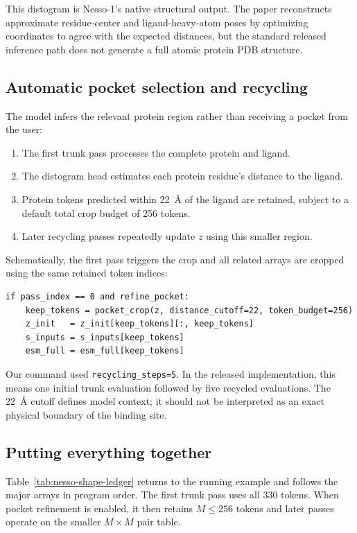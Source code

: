 \documentclass[11pt]{article}
\begin{document}
This distogram is Nesso-1's native structural output. The paper reconstructs
approximate residue-center and ligand-heavy-atom poses by optimizing coordinates
to agree with the expected distances, but the standard released inference path
does not generate a full atomic protein PDB structure.

\subsection{Automatic pocket selection and recycling}

The model infers the relevant protein region rather than receiving a pocket
from the user:

\begin{enumerate}
  \item The first trunk pass processes the complete protein and ligand.
  \item The distogram head estimates each protein residue's distance to the
  ligand.
  \item Protein tokens predicted within 22~\AA{} of the ligand are retained,
  subject to a default total crop budget of 256 tokens.
  \item Later recycling passes repeatedly update $z$ using this smaller region.
\end{enumerate}

Schematically, the first pass triggers the crop and all related arrays are
cropped using the same retained token indices:
\begin{verbatim}
if pass_index == 0 and refine_pocket:
    keep_tokens = pocket_crop(z, distance_cutoff=22, token_budget=256)
    z_init   = z_init[keep_tokens][:, keep_tokens]
    s_inputs = s_inputs[keep_tokens]
    esm_full = esm_full[keep_tokens]
\end{verbatim}

Our command used \texttt{recycling\_steps=5}. In the released implementation,
this means one initial trunk evaluation followed by five recycled evaluations.
The 22~\AA{} cutoff defines model context; it should not be interpreted as an
exact physical boundary of the binding site.

\subsection{Putting everything together}

Table~\ref{tab:nesso-shape-ledger} returns to the running example and follows
the major arrays in program order. The first trunk pass uses all 330 tokens.
When pocket refinement is enabled, it then retains $M\leq256$ tokens and later
passes operate on the smaller $M\times M$ pair table.
\end{document}
